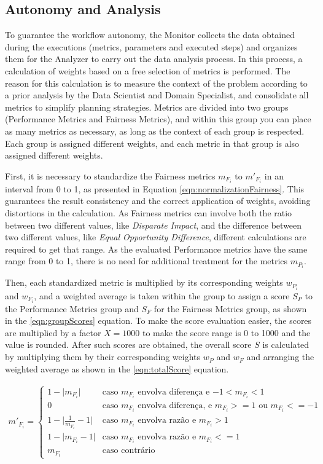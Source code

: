 \documentclass[runningheads]{llncs}
\begin{document}
\subsection{Autonomy and Analysis}

To guarantee the workflow autonomy, the Monitor collects the data obtained during the executions (metrics, parameters and executed steps) and organizes them for the Analyzer to carry out the data analysis process. In this process, a calculation of weights based on a free selection of metrics is performed. The reason for this calculation is to measure the context of the problem according to a prior analysis by the Data Scientist and Domain Specialist, and consolidate all metrics to simplify planning strategies. Metrics are divided into two groups (Performance Metrics and Fairness Metrics), and within this group you can place as many metrics as necessary, as long as the context of each group is respected. Each group is assigned different weights, and each metric in that group is also assigned different weights.

First, it is necessary to standardize the Fairness metrics $m_{F_i}$ to $m'_{F_i}$ in an interval from 0 to 1, as presented in Equation \ref{eqn:normalizationFairness}. This guarantees the result consistency and the correct application of weights, avoiding distortions in the calculation. As Fairness metrics can involve both the ratio between two different values, like \textit{Disparate Impact}, and the difference between two different values, like \textit{Equal Opportunity Difference}, different calculations are required to get that range. As the evaluated Performance metrics have the same range from 0 to 1, there is no need for additional treatment for the metrics $m_{P_i}$.

Then, each standardized metric is multiplied by its corresponding weights $w_{P_i}$ and $w_{F_i}$, and a weighted average is taken within the group to assign a score $S_P$ to the Performance Metrics group and $S_F$ for the Fairness Metrics group, as shown in the \ref{eqn:groupScores} equation. To make the score evaluation easier, the scores are multiplied by a factor $X = 1000$ to make the score range is 0 to 1000 and the value is rounded. After such scores are obtained, the overall score $S$ is calculated by multiplying them by their corresponding weights $w_P$ and $w_F$ and arranging the weighted average as shown in the \ref{eqn:totalScore} equation.

\begin{gather}
\label{eqn:normalizationFairness}
	m'_{F_i} = 
	\begin{cases}
	1-\lvert m_{F_i} \rvert & \text{caso $m_{F_i}$ envolva diferen\c{c}a e $-1 < m_{F_i} < 1$}\\
	0 & \text{caso $m_{F_i}$ envolva diferen\c{c}a, e $m_{F_i} >= 1$ ou $m_{F_i} <= -1$}\\
	1-\lvert \frac{1}{m_{F_i}}-1 \lvert & \text{caso $m_{F_i}$ envolva razão e $m_{F_i} > 1$}\\
	1-\lvert m_{F_i}-1 \lvert & \text{caso $m_{F_i}$ envolva razão e $m_{F_i} <= 1$}\\
	m_{F_i} & \text{caso contrário}
	\end{cases}
\end{gather}
\end{document}
